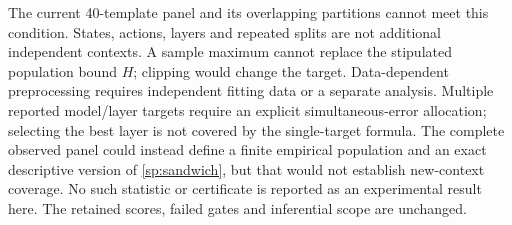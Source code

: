 The current 40-template panel and its overlapping partitions cannot meet this condition. States, actions, layers and repeated splits are not additional independent contexts. A sample maximum cannot replace the stipulated population bound $H$; clipping would change the target. Data-dependent preprocessing requires independent fitting data or a separate analysis. Multiple reported model/layer targets require an explicit simultaneous-error allocation; selecting the best layer is not covered by the single-target formula. The complete observed panel could instead define a finite empirical population and an exact descriptive version of \cref{sp:sandwich}, but that would not establish new-context coverage. No such statistic or certificate is reported as an experimental result here. The retained scores, failed gates and inferential scope are unchanged.
